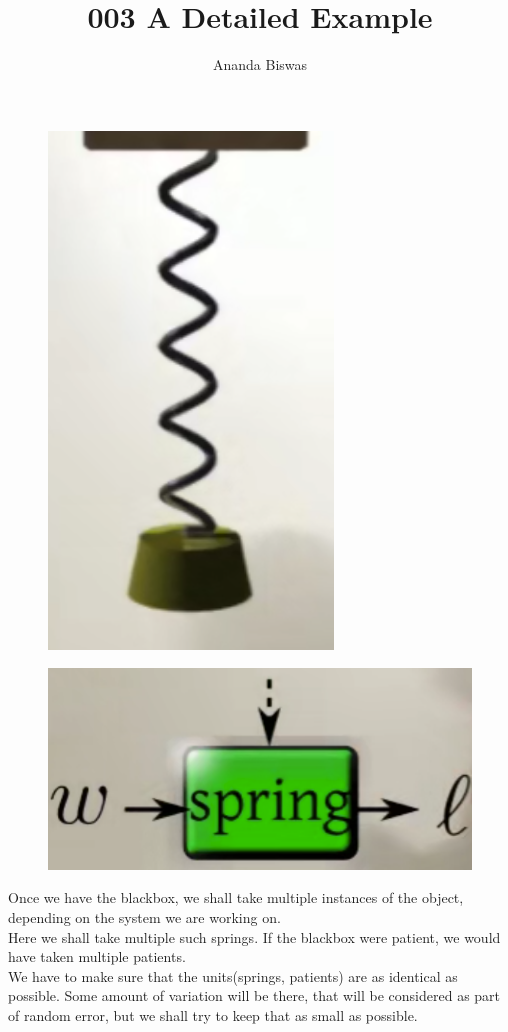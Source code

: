 \documentclass[11pt, a4paper]{article}\usepackage[]{graphicx}\usepackage[]{xcolor}
\title{003 A Detailed Example}
\author{Ananda Biswas}
\date{}
\begin{document}
\maketitle

\begin{figure}[h]
	\centering
	\includegraphics[scale = 0.35]{Screenshot (1473)}\\
\end{figure}

\begin{figure}[h]
	\centering
	\includegraphics[scale = 0.35]{Screenshot (1474)}\\
\end{figure}

Once we have the blackbox, we shall take multiple instances of the object, depending on the system we are working on.\\
Here we shall take multiple such springs. If the blackbox were patient, we would have taken multiple patients. \\
We have to make sure that the units(springs, patients) are as identical as possible. Some amount of variation will be there, that will be considered as part of random error, but we shall try to keep that as small as possible.\\
\end{document}
